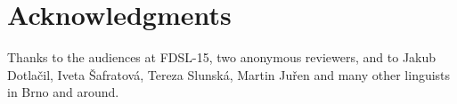 \documentclass[output=paper,colorlinks,citecolor=brown]{langscibook}
\begin{document}
\section*{Acknowledgments}\label{sec:acknowl}
Thanks to the audiences at FDSL-15, two anonymous reviewers, and to  Jakub Dotlačil, Iveta Šafratová, Tereza Slunská, Martin Juřen and many other linguists in Brno and around.  

\printbibliography[heading=subbibliography,notkeyword=this] 
\end{document}
